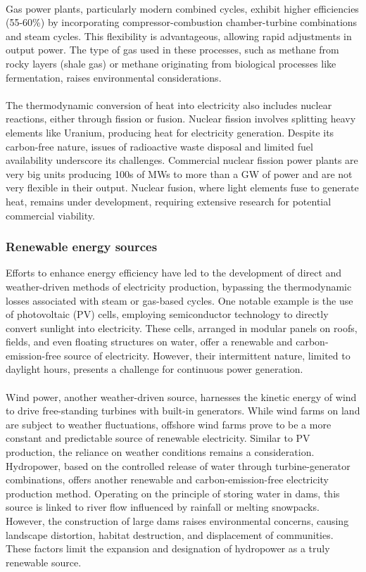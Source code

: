 \documentclass[../summary.tex]{subfiles}
\begin{document}
\ \\
Gas power plants, particularly modern combined cycles, exhibit higher efficiencies (55-60\%) by incorporating compressor-combustion chamber-turbine combinations and steam cycles. This flexibility is advantageous, allowing rapid adjustments in output power. The type of gas used in these processes, such as methane from rocky layers (shale gas) or methane originating from biological processes like fermentation, raises environmental considerations.\\
\\
The thermodynamic conversion of heat into electricity also includes nuclear reactions, either through fission or fusion. Nuclear fission involves splitting heavy elements like Uranium, producing heat for electricity generation. Despite its carbon-free nature, issues of radioactive waste disposal and limited fuel availability underscore its challenges. Commercial nuclear fission power plants are very big units producing 100s of MWs to more than a GW of power and are not very flexible in their output. Nuclear fusion, where light elements fuse to generate heat, remains under development, requiring extensive research for potential commercial viability.

\subsubsection{Renewable energy sources}

Efforts to enhance energy efficiency have led to the development of direct and weather-driven methods of electricity production, bypassing the thermodynamic losses associated with steam or gas-based cycles. One notable example is the use of photovoltaic (PV) cells, employing semiconductor technology to directly convert sunlight into electricity. These cells, arranged in modular panels on roofs, fields, and even floating structures on water, offer a renewable and carbon-emission-free source of electricity. However, their intermittent nature, limited to daylight hours, presents a challenge for continuous power generation.\\
\\
Wind power, another weather-driven source, harnesses the kinetic energy of wind to drive free-standing turbines with built-in generators. While wind farms on land are subject to weather fluctuations, offshore wind farms prove to be a more constant and predictable source of renewable electricity. Similar to PV production, the reliance on weather conditions remains a consideration.
\newpage
\ \\
Hydropower, based on the controlled release of water through turbine-generator combinations, offers another renewable and carbon-emission-free electricity production method. Operating on the principle of storing water in dams, this source is linked to river flow influenced by rainfall or melting snowpacks. However, the construction of large dams raises environmental concerns, causing landscape distortion, habitat destruction, and displacement of communities. These factors limit the expansion and designation of hydropower as a truly renewable source.
\end{document}
